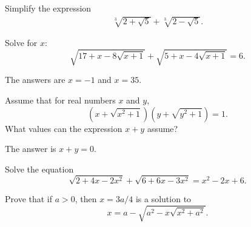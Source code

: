 \documentclass[12pt,a4paper]{memoir}
\theoremstyle{definition}
\begin{document}
\begin{question}[name={2009 Ecuador TST}]
	Simplify the expression
	\begin{align*}
		\sqrt[3]{2+\sqrt{5}}+\sqrt[3]{2-\sqrt{5}}.
	\end{align*}
\end{question}



\begin{question}[name={2008 Finland}]
	Solve for $x$:
	\[\sqrt{17+x-8\sqrt{x+1}} + \sqrt{5+x-4\sqrt{x+1}} = 6.\]
\end{question}


\begin{solution}
	The answers are $x=-1$ and $x=35$.
\end{solution}




\begin{question}[name={2014 Finland}]
	Assume that for real numbers $x$ and $y$,
	\[(x+\sqrt{x^2+1})(y+\sqrt{y^2+1}) = 1.\]
	What values can the expression $x + y$ assume?
\end{question}

\begin{solution}
	The answer is $x+y=0$.
\end{solution}


\begin{question}[name={2016 Finland}]
	Solve the equation
	\[\sqrt{2+4x-2x^2} + \sqrt{6+6x-3x^2} = x^2-2x+6.\]
\end{question}


\begin{question}[name={2017 Finland}]
	Prove that if $a>0$, then $x=3a/4$ is a solution to \[x = a - \sqrt{a^2-x\sqrt{x^2+a^2}}.\]
\end{question}
\end{document}
